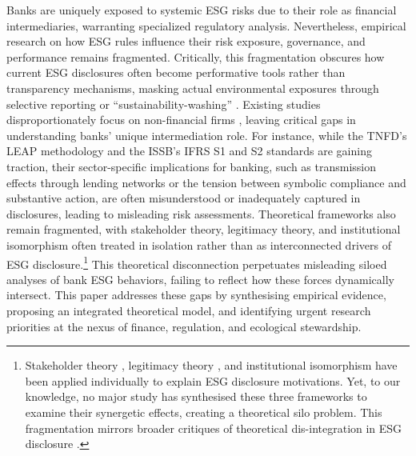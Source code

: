 \documentclass[
  authoryear]{elsarticle}
\begin{document}
Banks are uniquely exposed to systemic ESG risks due to their role as
financial intermediaries, warranting specialized regulatory analysis.
Nevertheless, empirical research on how ESG rules influence their risk
exposure, governance, and performance remains fragmented. Critically,
this fragmentation obscures how current ESG disclosures often become
performative tools rather than transparency mechanisms, masking actual
environmental exposures through selective reporting or
``sustainability-washing'' \citep{SMITH2022}. Existing studies
disproportionately focus on non-financial firms
\citep[e.g.][]{YOUN2015, FAVINO2019, BUALLAY2019, DYCK2019}, leaving
critical gaps in understanding banks' unique intermediation role. For
instance, while the TNFD's LEAP methodology and the ISSB's IFRS S1 and
S2 standards are gaining traction, their sector-specific implications
for banking, such as transmission effects through lending networks or
the tension between symbolic compliance and substantive action, are
often misunderstood or inadequately captured in disclosures, leading to
misleading risk assessments.\hspace{0pt}\hspace{0pt} Theoretical
frameworks also remain fragmented, with stakeholder theory, legitimacy
theory, and institutional isomorphism often treated in isolation rather
than as interconnected drivers of ESG disclosure.\footnote{Stakeholder
  theory \citep{FREEMAN1984, MITCHELL1997}, legitimacy theory
  \citep{SUCHMAN1995}, and institutional isomorphism
  \citep{DIMAGGIO1983} have been applied individually to explain ESG
  disclosure motivations. Yet, to our knowledge, \hspace{0pt}no major
  study\hspace{0pt} has synthesised these three frameworks to examine
  their synergetic effects, creating a theoretical silo problem. This
  fragmentation mirrors broader critiques of theoretical dis-integration
  in ESG disclosure \citep{ECCLES2012}.} This theoretical disconnection
perpetuates misleading siloed analyses of bank ESG behaviors, failing to
reflect how these forces dynamically intersect.\hspace{0pt} This paper
addresses these gaps by synthesising empirical evidence, proposing an
integrated theoretical model, and identifying urgent research priorities
at the nexus of finance, regulation, and ecological stewardship.
\end{document}
